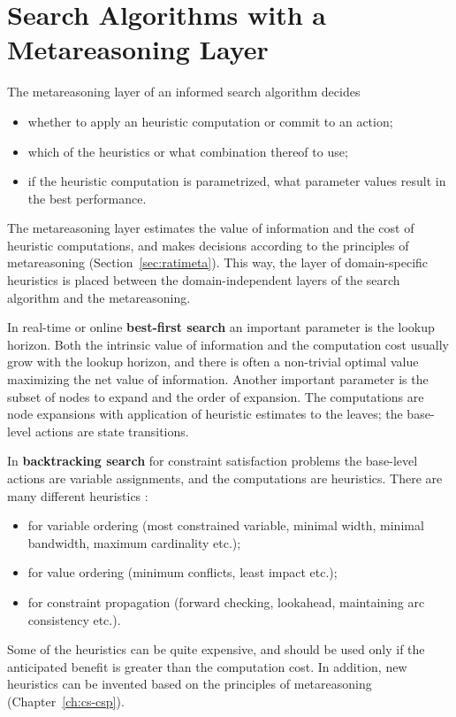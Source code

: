 \section{Search Algorithms
  with a Metareasoning Layer}

The metareasoning layer of an informed search algorithm decides
\begin{itemize}
\item whether to apply an heuristic computation or commit to an action;
\item which of the heuristics or what combination thereof to use;
\item if the heuristic computation is parametrized, what parameter values
  result in the best performance.
\end{itemize}
The metareasoning layer estimates the value of information and the
cost of heuristic computations, and makes decisions according to
the principles of metareasoning (Section~\ref{sec:ratimeta}). This
way, the layer of domain-specific heuristics is placed between the
domain-independent layers of the search algorithm and the
metareasoning.

In real-time or online {\bf best-first search} an important parameter
is the lookup horizon. Both the intrinsic value of information and the
computation cost usually grow with the lookup horizon, and there is
often a non-trivial optimal value maximizing the net value of
information. Another important parameter is the subset of nodes to
expand and the order of expansion. The computations are node
expansions with application of heuristic estimates to the leaves; the
base-level actions are state transitions.

In {\bf backtracking search} for constraint satisfaction problems
the base-level actions are variable assignments, and the computations are
heuristics.  There are many different heuristics \cite{Tsang.csp}:
\begin{itemize}
\item for variable ordering (most constrained variable, minimal width,
  minimal bandwidth, maximum cardinality etc.);
\item for value ordering (minimum conflicts, least impact etc.);
\item for constraint propagation (forward checking, lookahead, maintaining arc
  consistency etc.).
\end{itemize}
Some of the heuristics can be quite expensive, and should be used only
if the anticipated benefit is greater than the computation
cost. In addition, new heuristics can be invented based on the
principles of metareasoning (Chapter~\ref{ch:cs-csp}).

